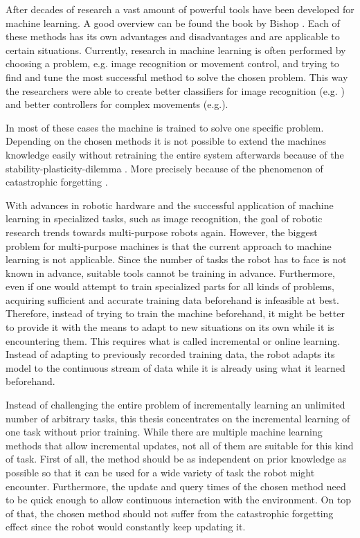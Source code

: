 After decades of research a vast amount of powerful tools have been developed for machine learning. A good overview can be found the book by Bishop \cite{bishop}. Each of these methods has its own advantages and disadvantages and are applicable to certain situations. Currently, research in machine learning is often performed by choosing a problem, e.g. image recognition or movement control, and trying to find and tune the most successful method to solve the chosen problem. This way the researchers were able to create better classifiers for image recognition (e.g. \cite{imageRecList}) and better controllers for complex movements (e.g.\cite{movementList}).


In most of these cases the machine is trained to solve one specific problem. Depending on the chosen methods it is not possible to extend the machines knowledge easily without retraining the entire system afterwards because of the stability-plasticity-dilemma \cite{stability-plasticity}. More precisely because of the phenomenon of catastrophic forgetting \cite{catastrophicForgetting1}.

With advances in robotic hardware and the successful application of machine learning in specialized tasks, such as image recognition, the goal of robotic research trends towards multi-purpose robots again. However, the biggest problem for multi-purpose machines is that the current approach to machine learning is not applicable. Since the number of tasks the robot has to face is not known in advance, suitable tools cannot be training in advance. Furthermore, even if one would attempt to train specialized parts for all kinds of problems, acquiring sufficient and accurate training data beforehand is infeasible at best. 
Therefore, instead of trying to train the machine beforehand, it might be better to provide it with the means to adapt to new situations on its own while it is encountering them. This requires what is called incremental or online learning. Instead of adapting to previously recorded training data, the robot adapts its model to the continuous stream of data while it is already using what it learned beforehand.

Instead of challenging the entire problem of incrementally learning an unlimited number of arbitrary tasks, this thesis concentrates on the incremental learning of one task without prior training. 
While there are multiple machine learning methods that allow incremental updates, not all of them are suitable for this kind of task. First of all, the method should be as independent on prior knowledge as possible so that it can be used for a wide variety of task the robot might encounter. Furthermore, the update and query times of the chosen method need to be quick enough to allow continuous interaction with the environment. On top of that, the chosen method should not suffer from the catastrophic forgetting effect since the robot would constantly keep updating it.


